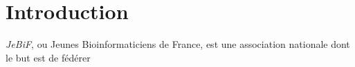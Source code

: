 \chapter*{Introduction}

\emph{JeBiF}, ou Jeunes Bioinformaticiens de France, est une association nationale dont le but est de fédérer 